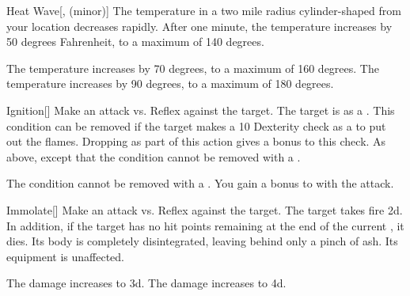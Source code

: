 \lowercase{\hypertarget{spell:Heat Wave}{}}\label{spell:Heat Wave}
\begin{freeability}[Rank 4]{\hypertarget{spell:Heat Wave}{Heat Wave}}[,  (minor)]
\targetrule
The temperature in a two mile radius cylinder-shaped  from your location decreases rapidly.
After one minute, the temperature increases by 50 degrees Fahrenheit, to a maximum of 140 degrees.

\rankline
{} The temperature increases by 70 degrees, to a maximum of 160 degrees.
 The temperature increases by 90 degrees, to a maximum of 180 degrees.
\end{freeability}
\vspace{0.25em}



\lowercase{\hypertarget{spell:Ignition}{}}\label{spell:Ignition}
\begin{freeability}[Rank 4]{\hypertarget{spell:Ignition}{Ignition}}[]
Make an attack vs. Reflex against the target.
\hit The target is  as a .
This condition can be removed if the target makes a  10 Dexterity check as a  to put out the flames.
Dropping  as part of this action gives a  bonus to this check.
\crit As above, except that the condition cannot be removed with a .

\rankline
{} The condition cannot be removed with a .
 You gain a  bonus to  with the attack.
\end{freeability}
\vspace{0.25em}



\lowercase{\hypertarget{spell:Immolate}{}}\label{spell:Immolate}
\begin{freeability}[Rank 4]{\hypertarget{spell:Immolate}{Immolate}}[]
Make an attack vs. Reflex against the target.
\hit The target takes fire  \plus2d.
In addition, if the target has no hit points remaining at the end of the current , it dies.
Its body is completely disintegrated, leaving behind only a pinch of ash.
Its equipment is unaffected.

\rankline
{} The damage increases to  \plus3d.
 The damage increases to  \plus4d.
\end{freeability}
\vspace{0.25em}



